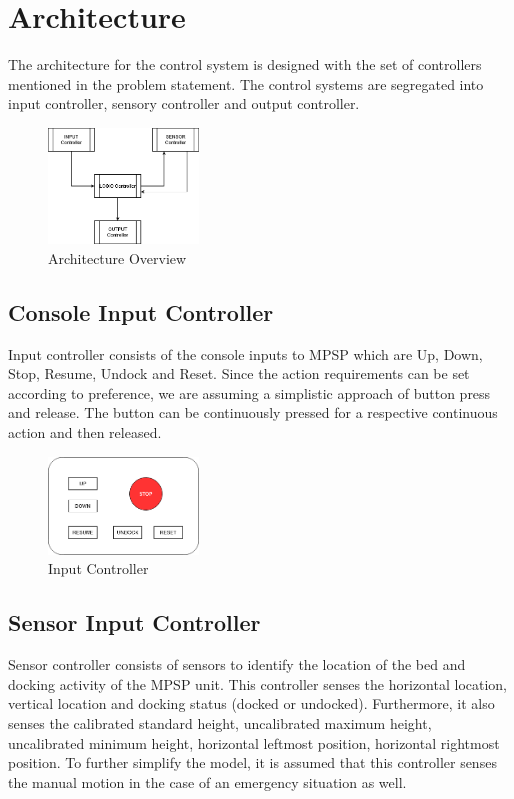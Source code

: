 \label{task4}
\section{Architecture}
The architecture for the control system is designed with the set of controllers mentioned in the problem statement. The control systems are segregated into input controller, sensory controller and output controller. 

\begin{figure}[htp]
    \centering
    \includegraphics[width=4cm]{chapters/images/Architecture.png}
    \caption{Architecture Overview}
    \label{fig:architecture}
\end{figure}

\subsection{Console Input Controller}
Input controller consists of the console inputs to MPSP which are Up, Down, Stop, Resume, Undock and Reset. Since the action requirements can be set according to preference, we are assuming a simplistic approach of button press and release. The button can be continuously pressed for a respective continuous action and then released.

\begin{figure}[htp]
    \centering
    \includegraphics[width=4cm]{chapters/images/Console.png}
    \caption{Input Controller}
    \label{fig:inputController}
\end{figure}

\subsection{Sensor Input Controller}
Sensor controller consists of sensors to identify the location of the bed and docking activity of the MPSP unit. This controller senses the horizontal location, vertical location and docking status (docked or undocked).  Furthermore, it also senses the calibrated standard height, uncalibrated maximum height, uncalibrated minimum height, horizontal leftmost position, horizontal rightmost position. To further simplify the model, it is assumed that this controller senses the manual motion in the case of an emergency situation as well.

